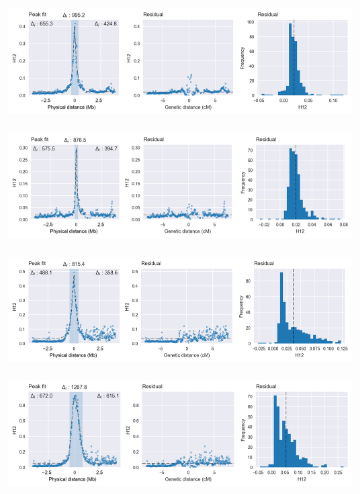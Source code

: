 \begin{refsection}
\begin{figure}[tp]
\begin{subfigure}[t]{0.32\textwidth}
    \end{subfigure}
    \hfill
    \begin{subfigure}[t]{0.32\textwidth}
        \centering
        \caption{}
        \includegraphics[width=1.1\textwidth,center,trim=0 0 380 0, clip]{artwork/chapter5/peak_fit_h12_gste_bfs.png}
    \end{subfigure}
    \begin{subfigure}[t]{0.32\textwidth}
        \centering
        \caption{}
        \includegraphics[width=1.1\textwidth,center,trim=0 0 380 0, clip]{artwork/chapter5/peak_fit_h12_gste_ugs.png}
    \end{subfigure}
    \vspace{0cm}
    \begin{subfigure}[t]{0.32\textwidth}
        \centering
        \caption{}
        \includegraphics[width=1.1\textwidth,center,trim=0 0 380 0, clip]{artwork/chapter5/peak_fit_h12_cyp9k1_bfs.png}
    \end{subfigure}
    \hfill
    \begin{subfigure}[t]{0.32\textwidth}
        \centering
        \caption{}
        \includegraphics[width=1.1\textwidth,center,trim=0 0 380 0, clip]{artwork/chapter5/peak_fit_h12_cyp9k1_bfm.png}

\end{subfigure}
\end{figure}
\end{refsection}
